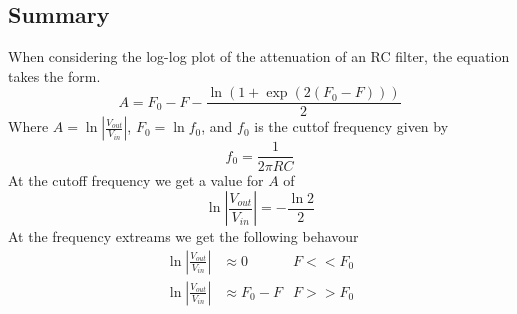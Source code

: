 \begin{framed}
\subsection*{Summary}
When considering the log-log plot of the attenuation of an RC filter, the equation
takes the form.
\begin{equation*}
  A = F_0 -F -\frac{\ln\left(1+\exp \left( 2 (F_0 - F) \right)\right)}{2}
\end{equation*}
Where $A=\ln \left|\frac{V_{out}}{V_{in}}\right|$, $F_0 = \ln f_0$, and $f_0$ is the cuttof frequency given by
\begin{equation*}
  f_0 = \frac{1}{2\pi R C}
\end{equation*}
At the cutoff frequency we get a value for $A$ of
\begin{equation*}
   \ln \left|\frac{V_{out}}{V_{in}}\right| = - \frac{\ln 2}{2}
\end{equation*}
At the frequency extreams we get the following behavour
\begin{align*}
  \ln \left|\frac{V_{out}}{V_{in}}\right| &\approx 0 & F<<F_0  \\
  \ln \left|\frac{V_{out}}{V_{in}}\right| &\approx F_0 -F &F>>F_0
\end{align*}
\end{framed}
